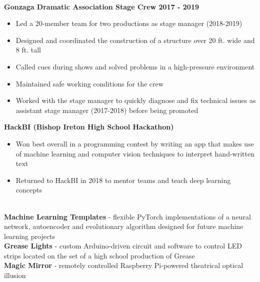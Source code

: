 \documentclass{article}
\begin{document}
\begin{center}
\begin{flushleft}
    {\large\textbf{\underline{}}} \\
    \textbf{Gonzaga Dramatic Association Stage Crew \hfill 2017 - 2019}
    \begin{itemize}
      \item Led a 20-member team for two productions as stage manager (2018-2019)
      \item Designed and coordinated the construction of a structure over 20 ft. wide and 8 ft. tall
      \item Called cues during shows and solved problems in a high-pressure environment
      \item Maintained safe working conditions for the crew
      \item Worked with the stage manager to quickly diagnose and fix technical issues as assistant stage manager (2017-2018) before being promoted
    \end{itemize}

    \textbf{HackBI  (Bishop Ireton High School Hackathon)}

    \begin{itemize}
      \item Won best overall in a programming contest by writing an app that makes use of machine learning and computer vision techniques to interpret hand-written text
      \item Returned to HackBI in 2018 to mentor teams and teach deep learning concepts
    \end{itemize}

    {\large\textbf{\underline{}}} \\
    \textbf{Machine Learning Templates} - flexible PyTorch implementations of a neural network, autoencoder and evolutionary algorithm designed for future machine learning projects \\
    \textbf{Grease Lights} - custom Arduino-driven circuit and software to control LED strips located on the set of a high school production of Grease \\
    \textbf{Magic Mirror} - remotely controlled Raspberry Pi-powered theatrical optical illusion



  \end{flushleft}
  \end{center}
\end{document}
